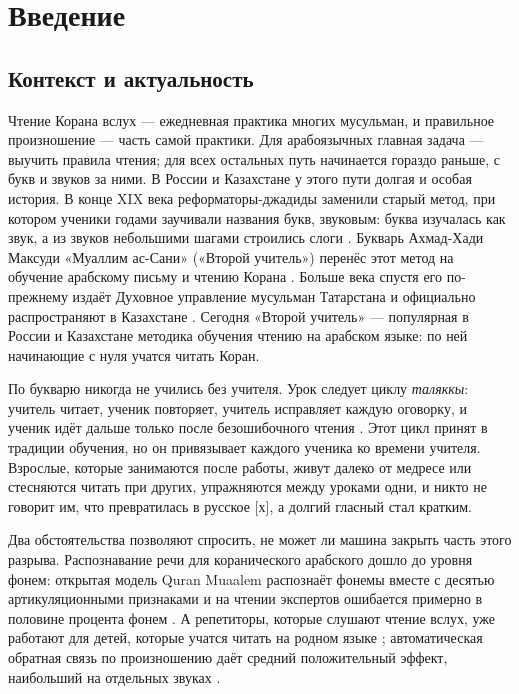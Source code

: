 \chapter{Введение}\label{ch:intro}

\section{Контекст и актуальность}

Чтение Корана вслух --- ежедневная практика многих мусульман, и правильное произношение --- часть самой
практики. Для арабоязычных главная задача --- выучить правила чтения; для всех остальных путь начинается
гораздо раньше, с букв и звуков за ними. В России и Казахстане у этого пути долгая и особая история.
В конце XIX века реформаторы-джадиды заменили старый метод, при котором ученики годами заучивали
названия букв, звуковым: буква изучалась как звук, а из звуков небольшими шагами строились слоги
\cite{SRC-016,SRC-017}. Букварь Ахмад-Хади Максуди «Муаллим ас-Сани» («Второй учитель») перенёс этот
метод на обучение арабскому письму и чтению Корана \cite{SRC-015,SRC-018}. Больше века спустя его по-прежнему издаёт Духовное управление
мусульман Татарстана и официально распространяют в Казахстане \cite{SRC-040,SRC-020}. Сегодня «Второй учитель»
--- популярная в России и Казахстане методика обучения чтению на арабском языке: по ней начинающие с нуля
учатся читать Коран.

По букварю никогда не учились без учителя. Урок следует циклу \emph{таляккы}: учитель читает, ученик
повторяет, учитель исправляет каждую оговорку, и ученик идёт дальше только после безошибочного чтения
\cite{SRC-021,SRC-058}. Этот цикл принят в традиции обучения, но он привязывает каждого ученика ко времени учителя. Взрослые,
которые занимаются после работы, живут далеко от медресе или стесняются читать при других, упражняются
между уроками одни, и никто не говорит им, что  превратилась в русское [х], а долгий гласный стал
кратким.

Два обстоятельства позволяют спросить, не может ли машина закрыть часть этого разрыва.
Распознавание речи для коранического арабского дошло до уровня фонем: открытая модель Quran Muaalem
распознаёт фонемы вместе с десятью артикуляционными признаками и на чтении экспертов ошибается примерно
в половине процента фонем \cite{SRC-002}. А репетиторы, которые слушают чтение вслух, уже работают для детей,
которые учатся читать на родном языке \cite{SRC-125,SRC-130,SRC-132}; автоматическая обратная связь по
произношению даёт средний положительный эффект, наибольший на отдельных звуках \cite{SRC-025}.

